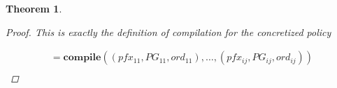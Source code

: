 \documentclass[twocolumn]{sig-alternate-10pt}
\newtheorem{thm}{Theorem}
\begin{document}
\begin{thm}
\begin{proof}
  This is exactly the definition of compilation for the concretized policy

  \[ \begin{array}{l}
     = \textbf{compile}( (pfx_{11},PG_{11},ord_{11}), \dots, (pfx_{ij},PG_{ij},ord_{ij}) ) \\
  \end{array} \]%


  \end{proof}

\end{thm}
\end{document}
